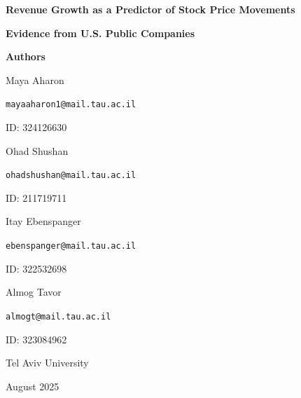 \documentclass[11pt]{article}
\begin{document}
\begin{titlepage}
    \begin{center}
        \vspace*{\fill}
        {\Huge\bfseries Revenue Growth as a Predictor of Stock Price Movements \par}
        \vspace{0.3cm}
        {\LARGE\bfseries Evidence from U.S. Public Companies \par}
        \vspace{2.5cm}
        {\Large\bfseries Authors \par}
        \vspace{1cm}
        {\large
        Maya Aharon \par
        \texttt{mayaaharon1@mail.tau.ac.il} \par
        ID: 324126630 \par
        \vspace{0.5cm}
        Ohad Shushan \par
        \texttt{ohadshushan@mail.tau.ac.il} \par
        ID: 211719711 \par
        \vspace{0.5cm}
        Itay Ebenspanger \par
        \texttt{ebenspanger@mail.tau.ac.il} \par
        ID: 322532698 \par
        \vspace{0.5cm}
        Almog Tavor \par
        \texttt{almogt@mail.tau.ac.il} \par
        ID: 323084962 \par
        }
        \vspace{2cm}
        {\Large Tel Aviv University \par}
        {\large August 2025 \par}
        \vspace*{\fill}
    \end{center}
    \thispagestyle{empty}
\end{titlepage}
\end{document}
